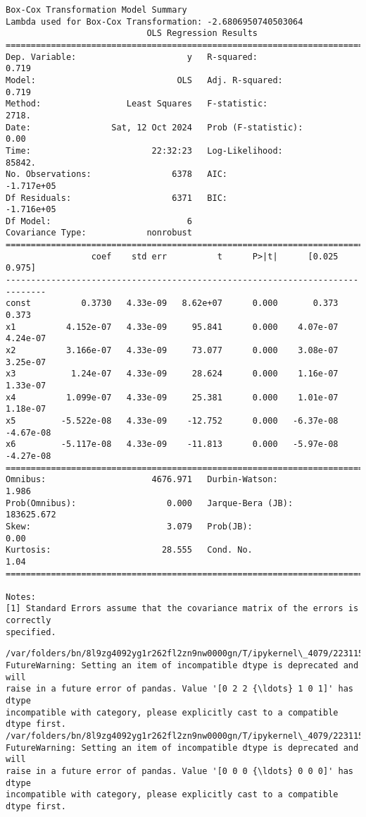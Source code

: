 \documentclass[11pt]{article}
\begin{document}
    \begin{Verbatim}[commandchars=\\\{\}]
Box-Cox Transformation Model Summary
Lambda used for Box-Cox Transformation: -2.6806950740503064
                            OLS Regression Results
==============================================================================
Dep. Variable:                      y   R-squared:                       0.719
Model:                            OLS   Adj. R-squared:                  0.719
Method:                 Least Squares   F-statistic:                     2718.
Date:                Sat, 12 Oct 2024   Prob (F-statistic):               0.00
Time:                        22:32:23   Log-Likelihood:                 85842.
No. Observations:                6378   AIC:                        -1.717e+05
Df Residuals:                    6371   BIC:                        -1.716e+05
Df Model:                           6
Covariance Type:            nonrobust
==============================================================================
                 coef    std err          t      P>|t|      [0.025      0.975]
------------------------------------------------------------------------------
const          0.3730   4.33e-09   8.62e+07      0.000       0.373       0.373
x1          4.152e-07   4.33e-09     95.841      0.000    4.07e-07    4.24e-07
x2          3.166e-07   4.33e-09     73.077      0.000    3.08e-07    3.25e-07
x3           1.24e-07   4.33e-09     28.624      0.000    1.16e-07    1.33e-07
x4          1.099e-07   4.33e-09     25.381      0.000    1.01e-07    1.18e-07
x5         -5.522e-08   4.33e-09    -12.752      0.000   -6.37e-08   -4.67e-08
x6         -5.117e-08   4.33e-09    -11.813      0.000   -5.97e-08   -4.27e-08
==============================================================================
Omnibus:                     4676.971   Durbin-Watson:                   1.986
Prob(Omnibus):                  0.000   Jarque-Bera (JB):           183625.672
Skew:                           3.079   Prob(JB):                         0.00
Kurtosis:                      28.555   Cond. No.                         1.04
==============================================================================

Notes:
[1] Standard Errors assume that the covariance matrix of the errors is correctly
specified.
    \end{Verbatim}

    \begin{Verbatim}[commandchars=\\\{\}]
/var/folders/bn/8l9zg4092yg1r262fl2zn9nw0000gn/T/ipykernel\_4079/2231151566.py:3:
FutureWarning: Setting an item of incompatible dtype is deprecated and will
raise in a future error of pandas. Value '[0 2 2 {\ldots} 1 0 1]' has dtype
incompatible with category, please explicitly cast to a compatible dtype first.
/var/folders/bn/8l9zg4092yg1r262fl2zn9nw0000gn/T/ipykernel\_4079/2231151566.py:3:
FutureWarning: Setting an item of incompatible dtype is deprecated and will
raise in a future error of pandas. Value '[0 0 0 {\ldots} 0 0 0]' has dtype
incompatible with category, please explicitly cast to a compatible dtype first.
    \end{Verbatim}
\end{document}
